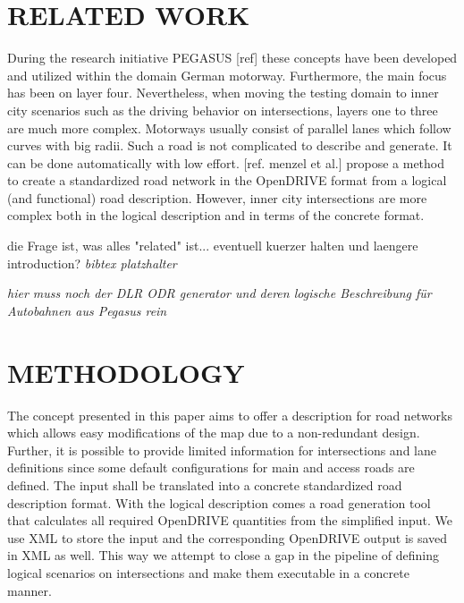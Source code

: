 \documentclass[a4paper, 10pt, conference]{ieeeconf}      %
\begin{document}
\section{RELATED WORK}
During the research initiative PEGASUS [ref] these concepts have been developed and utilized within the domain German motorway. Furthermore, the main focus has been on layer four. Nevertheless, when moving the testing domain to inner city scenarios such as the driving behavior on intersections, layers one to three are much more complex. Motorways usually consist of parallel lanes which follow curves with big radii. Such a road is not complicated to describe and generate. It can be done automatically with low effort. [ref. menzel et al.] propose a method to create a standardized road network in the OpenDRIVE format from a logical (and functional) road description. However, inner city intersections are more complex both in the logical description and in terms of the concrete format. 

die Frage ist, was alles "related" ist... eventuell kuerzer halten und laengere introduction? \textit{bibtex platzhalter} \cite{BagschikG..2018} \cite{Roesener2017}

\textit{hier muss noch der DLR ODR generator und deren logische Beschreibung für Autobahnen aus Pegasus rein \cite{dlrODRgen}}
\section{METHODOLOGY}
The concept presented in this paper aims to offer a description for road networks which allows easy modifications of the map due to a non-redundant design. Further, it is possible to provide limited information for intersections and lane definitions since some default configurations for main and access roads are defined. The input shall be translated into a concrete standardized road description format. With the logical description comes a road generation tool that calculates all required OpenDRIVE quantities from the simplified input. We use XML to store the input and the corresponding OpenDRIVE output is saved in XML as well. This way we attempt to close a gap in the pipeline of defining logical scenarios on intersections and make them executable in a concrete manner.
\end{document}

